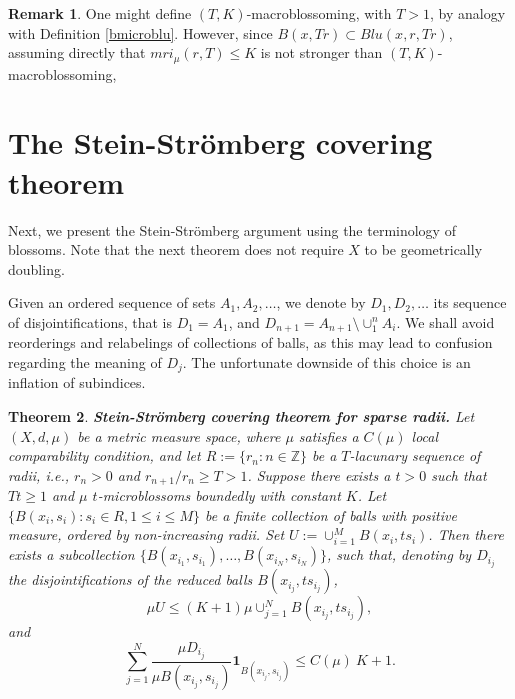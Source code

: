 \documentclass[12pt]{amsart}
\newtheorem{theorem}{Theorem}[section]
\theoremstyle{definition}
\newtheorem{remark}[theorem]{Remark}
\theoremstyle{parrafo}
\begin{document}
 \begin{remark} One might define $(T, K)$-macroblossoming, 
 with $T > 1$, by analogy with Definition \ref{bmicroblu}. 
 However, since $B(x, T r) \subset Blu(x, r, T r)$, assuming
 directly that $mri_{\mu}(r, T) \le K$ is not stronger than $(T, K)$-macroblossoming, 
\end{remark}



\section{The Stein-Str\"omberg covering theorem} 


Next, we present the Stein-Str\"omberg argument 
using the terminology of blossoms. Note  that
the next theorem does not require $X$ to be geometrically doubling.


Given an ordered sequence of sets $A_1, A_2, \dots$, we denote by $D_1, D_2, \dots$
its sequence of disjointifications, that is 
$D_1 = A_1$, and $D_{n + 1} = A_{n + 1}\setminus \cup_1^n A_i$. We shall avoid reorderings and
relabelings of collections of balls, as this may lead to confusion regarding the meaning of $D_j$. The
unfortunate downside of this choice  is an inflation of subindices.


\begin{theorem}\label{StSt1} {\bf Stein-Str\"omberg covering theorem for sparse radii.} Let $(X, d, \mu)$ be a metric measure space, where $\mu$ satisfies a $C(\mu)$ local comparability condition, and let $R:= \{r_n: n\in \mathbb{Z}\}$ be a $T$-lacunary sequence of radii, i.e.,
$r_n >0$ and $r_{n+1}/r_n \ge T > 1$. Suppose there exists a $t > 0$ such that $T  t \ge 1$ and 
$\mu$ $t$-microblossoms boundedly 
  with constant $K$. Let $\{B(x_i, s_i): s_i \in R, 1 \le i \le M\}$ be a finite collection
of balls with positive measure, ordered by non-increasing radii. Set $U:= \cup_{i = 1}^M   B(x_i, t s_i)$. Then there exists a
subcollection $\{B(x_{i_1}, s_{i_1}), \dots, B(x_{i_N}, s_{i_N})\}$, 
 such that, denoting by $D_{i_j}$  the disjointifications of the reduced balls $B(x_{i_j}, t s_{i_j})$,   
\begin{equation}\label{set}
\mu U \le (K + 1) \mu \cup_{j=1}^N   B(x_{i_j}, t s_{i_j}),
\end{equation}
 and 
 \begin{equation}\label{bound}
\sum_{j=1}^N \frac{\mu D_{i_j}}{\mu B(x_{i_j}, s_{i_j})}\mathbf{1}_{B(x_{i_j}, s_{i_j})}
\le C(\mu) \ K + 1.
\end{equation}
 \end{theorem}
 
\end{document}
